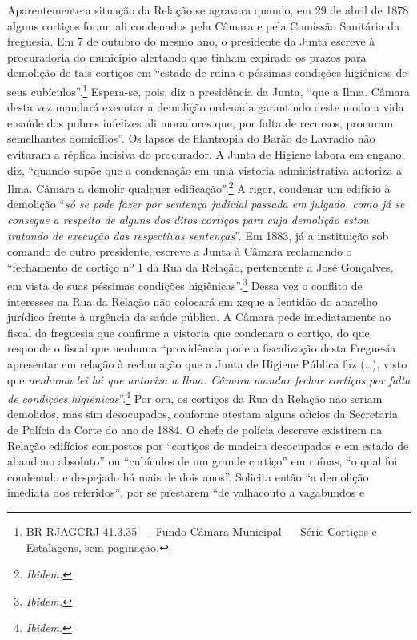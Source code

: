 Aparentemente a situação da Relação se agravara quando, em 29 de abril
de 1878 alguns cortiços foram ali condenados pela Câmara e pela Comissão
Sanitária da freguesia. Em 7 de outubro do mesmo ano, o presidente da
Junta escreve à procuradoria do município alertando que tinham expirado
os prazos para demolição de tais cortiços em ``estado de ruína e
péssimas condições higiênicas de seus cubículos''.\footnote{BR RJAGCRJ
  41.3.35 --- Fundo Câmara Municipal --- Série Cortiços e Estalagens, sem
  paginação.} Espera-se, pois, diz a presidência da Junta, ``que a Ilma.
Câmara desta vez mandará executar a demolição ordenada garantindo deste
modo a vida e saúde dos pobres infelizes ali moradores que, por falta de
recursos, procuram semelhantes domicílios''. Os lapsos de filantropia do
Barão de Lavradio não evitaram a réplica incisiva do procurador. A Junta
de Higiene labora em engano, diz, ``quando supõe que a condenação em uma
vistoria administrativa autoriza a Ilma. Câmara a demolir qualquer
edificação''.\footnote{\textit{Ibidem.}} A rigor, condenar um edifício à
demolição ``\textit{só se pode fazer por sentença judicial passada em
julgado, como já se consegue a respeito de alguns dos ditos cortiços
para cuja demolição estou tratando de execução das respectivas
sentenças}''. Em 1883, já a instituição sob comando de outro presidente,
escreve a Junta à Câmara reclamando o ``fechamento de cortiço nº 1 da
Rua da Relação, pertencente a José Gonçalves, em vista de suas péssimas
condições higiênicas''.\footnote{\textit{Ibidem.}} Dessa vez o conflito de
interesses na Rua da Relação não colocará em xeque a lentidão do
aparelho jurídico frente à urgência da saúde pública. A Câmara pede
imediatamente ao fiscal da freguesia que confirme a vistoria que
condenara o cortiço, do que responde o fiscal que nenhuma ``providência
pode a fiscalização desta Freguesia apresentar em relação à reclamação
que a Junta de Higiene Pública faz (\dots{}), visto que \textit{nenhuma lei há
que autoriza a Ilma. Câmara mandar fechar cortiços por falta de
condições higiênicas}''.\footnote{\textit{Ibidem}.} Por ora, os cortiços
da Rua da Relação não seriam demolidos, mas sim desocupados, conforme
atestam alguns ofícios da Secretaria de Polícia da Corte do ano de 1884.
O chefe de polícia descreve existirem na Relação edifícios compostos por
``cortiços de madeira desocupados e em estado de abandono absoluto'' ou
``cubículos de um grande cortiço'' em ruínas, ``o qual foi condenado e
despejado há mais de dois anos''. Solicita então ``a demolição imediata
dos referidos'', por se prestarem ``de valhacouto a vagabundos e
